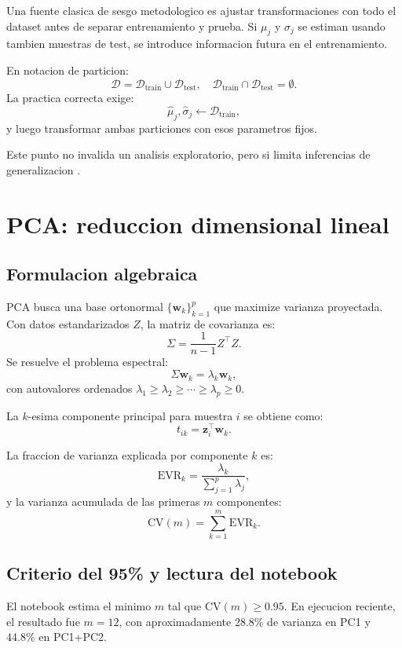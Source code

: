 \documentclass[12pt,a4paper,oneside]{report}
\begin{document}
Una fuente clasica de sesgo metodologico es ajustar transformaciones con todo el dataset antes de separar entrenamiento y prueba. Si $\mu_j$ y $\sigma_j$ se estiman usando tambien muestras de test, se introduce informacion futura en el entrenamiento.

En notacion de particion:
\[
\mathcal{D} = \mathcal{D}_{\text{train}} \cup \mathcal{D}_{\text{test}}, \quad
\mathcal{D}_{\text{train}} \cap \mathcal{D}_{\text{test}} = \emptyset.
\]
La practica correcta exige:
\[
\hat{\mu}_j, \hat{\sigma}_j \leftarrow \mathcal{D}_{\text{train}},
\]
y luego transformar ambas particiones con esos parametros fijos.

Este punto no invalida un analisis exploratorio, pero si limita inferencias de generalizacion \cite{kapoor2023}.

\chapter{PCA: reduccion dimensional lineal}

\section{Formulacion algebraica}

PCA busca una base ortonormal $\{\mathbf{w}_k\}_{k=1}^{p}$ que maximize varianza proyectada. Con datos estandarizados $Z$, la matriz de covarianza es:
\[
\Sigma = \frac{1}{n-1} Z^\top Z.
\]
Se resuelve el problema espectral:
\[
\Sigma \mathbf{w}_k = \lambda_k \mathbf{w}_k,
\]
con autovalores ordenados $\lambda_1 \geq \lambda_2 \geq \cdots \geq \lambda_p \geq 0$.

La $k$-esima componente principal para muestra $i$ se obtiene como:
\[
t_{ik} = \mathbf{z}_i^\top \mathbf{w}_k.
\]

La fraccion de varianza explicada por componente $k$ es:
\[
\mathrm{EVR}_k = \frac{\lambda_k}{\sum_{j=1}^{p} \lambda_j},
\]
y la varianza acumulada de las primeras $m$ componentes:
\[
\mathrm{CV}(m) = \sum_{k=1}^{m} \mathrm{EVR}_k.
\]

\section{Criterio del 95\% y lectura del notebook}

El notebook estima el minimo $m$ tal que $\mathrm{CV}(m) \ge 0.95$. En ejecucion reciente, el resultado fue $m=12$, con aproximadamente 28.8\% de varianza en PC1 y 44.8\% en PC1+PC2.
\end{document}
